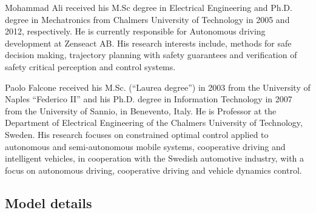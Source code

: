 \documentclass[journal]{IEEEtran}
\begin{document}
	\begin{IEEEbiography}{Mohammad Ali}
		received his M.Sc degree in Electrical Engineering and Ph.D. degree in Mechatronics from Chalmers University of Technology in 2005 and 2012, respectively. He is currently responsible for Autonomous driving development at Zenseact AB. His research interests include, methods for safe decision making, trajectory planning with safety guarantees and verification of safety critical perception and control systems.  
	\end{IEEEbiography}

	\begin{IEEEbiography}{Paolo Falcone}
		received his M.Sc. (“Laurea degree”) in 2003 from the University of Naples “Federico II” and his Ph.D. degree in Information Technology in 2007 from the University of Sannio, in Benevento, Italy. He is Professor at the Department of Electrical Engineering of the Chalmers University of Technology, Sweden. His research focuses on constrained optimal control applied to autonomous and semi-autonomous mobile systems, cooperative driving and intelligent vehicles, in cooperation with the Swedish automotive industry, with a focus on autonomous driving, cooperative driving and vehicle dynamics control.
	\end{IEEEbiography}
	
	\appendix
	
	\subsection{Model details}\label{appendix:model}
	
\end{document}
